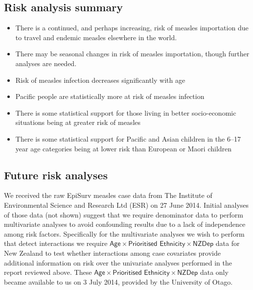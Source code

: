 \documentclass{article}
\begin{document}
\subsection{Risk analysis summary}
\begin{itemize}
\item There is a continued, and perhaps increasing, risk of measles importation due to travel and endemic measles elsewhere in the world.
\item There may be seasonal changes in risk of measles importation, though further analyses are needed.
\item Risk of measles infection decreases significantly with age
\item Pacific people are statistically more at risk of measles infection
\item There is some statistical support for those living in better socio-economic situations being at greater risk of measles
\item There is some statistical support for Pacific and Asian children in the 6--17 year age categories being at lower risk than European or Maori children
\end{itemize}

\subsection{Future risk analyses}
We received the raw EpiSurv measles case data from The Institute of Environmental Science and Research Ltd (ESR) on 27 June 2014. Initial analyses of those data (not shown) suggest that we require denominator data to perform multivariate analyses to avoid confounding results due to a lack of independence among risk factors. Specifically for the multivariate analyses we wish to perform that detect interactions we require $\textsf{Age} \times \textsf{Prioritised Ethnicity} \times \textsf{NZDep}$ data for New Zealand to test whether interactions among case covariates provide additional information on risk over the univariate analyses performed in the report reviewed above. These $\textsf{Age} \times \textsf{Prioritised Ethnicity} \times \textsf{NZDep}$ data only became available to us on 3 July 2014, provided by the University of Otago.
\end{document}
